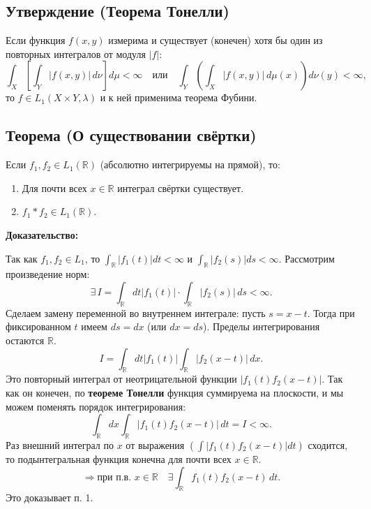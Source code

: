 \documentclass[12pt,a4paper,openany]{book}
\begin{document}
\bigskip

\subsection{Утверждение (Теорема Тонелли)}

Если функция $f(x, y)$ измерима и существует (конечен) хотя бы один из повторных интегралов от модуля $|f|$:
$$
\int_X \left[ \int_Y |f(x, y)| \, d\nu \right] d\mu < \infty \quad \text{или} \quad \int_Y \left( \int_X |f(x, y)| \, d\mu(x) \right) d\nu(y) < \infty,
$$
то $f \in L_1(X \times Y, \lambda)$ и к ней применима теорема Фубини.

\hrulefill

\bigskip

\subsection{Теорема (О существовании свёртки)}

Если $f_1, f_2 \in L_1(\mathbb{R})$ (абсолютно интегрируемы на прямой), то:
\begin{enumerate}
    \item Для почти всех $x \in \mathbb{R}$ интеграл свёртки существует.
    \item $f_1 * f_2 \in L_1(\mathbb{R})$.
\end{enumerate}

\textbf{Доказательство:}

Так как $f_1, f_2 \in L_1$, то $\int_{\mathbb{R}} |f_1(t)|dt < \infty$ и $\int_{\mathbb{R}} |f_2(s)|ds < \infty$.
Рассмотрим произведение норм:
$$
\exists \, I = \int_{\mathbb{R}} dt |f_1(t)| \cdot \int_{\mathbb{R}} |f_2(s)| \, ds < \infty.
$$
Сделаем замену переменной во внутреннем интеграле: пусть $s = x - t$. Тогда при фиксированном $t$ имеем $ds = dx$ (или $dx = ds$). Пределы интегрирования остаются $\mathbb{R}$.
$$
I = \int_{\mathbb{R}} dt |f_1(t)| \int_{\mathbb{R}} |f_2(x-t)| \, dx.
$$
Это повторный интеграл от неотрицательной функции $|f_1(t)f_2(x-t)|$. Так как он конечен, по \textbf{теореме Тонелли} функция суммируема на плоскости, и мы можем поменять порядок интегрирования:
$$
\int_{\mathbb{R}} dx \int_{\mathbb{R}} |f_1(t) f_2(x-t)| \, dt = I < \infty.
$$
Раз внешний интеграл по $x$ от выражения $\left( \int |f_1(t) f_2(x-t)| dt \right)$ сходится, то подынтегральная функция конечна для почти всех $x \in \mathbb{R}$.
$$
\Rightarrow \text{при п.в. } x \in \mathbb{R} \quad \exists \int_{\mathbb{R}} f_1(t) f_2(x-t) \, dt.
$$
Это доказывает п. 1.
\end{document}
